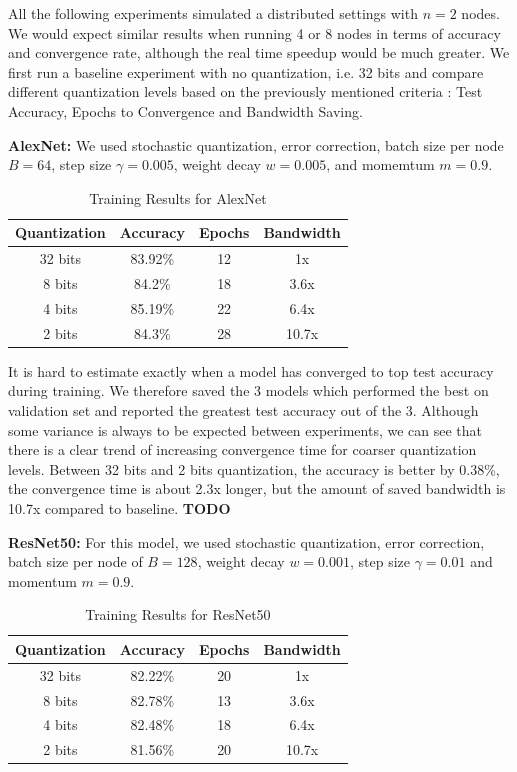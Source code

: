 \documentclass[10pt,conference,compsocconf]{IEEEtran}
\begin{document}
All the following experiments simulated a distributed settings with $n = 2$ nodes. We would expect similar results when running 4 or 8 nodes in terms of accuracy and convergence rate, although the real time speedup would be much greater. We first run a baseline experiment with no quantization, i.e. 32 bits and compare different quantization levels based on the previously mentioned criteria : Test Accuracy, Epochs to Convergence and Bandwidth Saving.

\textbf{AlexNet:} We used stochastic quantization, error correction, batch size per node $B = 64$, step size $\gamma = 0.005$, weight decay $w = 0.005$, and momemtum $m = 0.9$. 

\begin{table}[htbp]
  \centering
  \begin{tabular}[c]{|c||c|c|c|}
    \hline
	  Quantization&Accuracy&Epochs&Bandwidth\\
    \hline
	  32 bits&83.92\% &12&1x\\
	  8 bits&84.2\%&18&3.6x\\
	  4 bits&85.19\%&22&6.4x\\
	  2 bits&84.3\%&28&10.7x\\
    \hline
  \end{tabular}
	\vspace{0.7em}
	\caption{Training Results for AlexNet}
\end{table}

\vspace{-1.5em}
\noindent It is hard to estimate exactly when a model has converged to top test accuracy during training. We therefore saved the 3 models which performed the best on validation set and reported the greatest test accuracy out of the 3. Although some variance is always to be expected between experiments, we can see that there is a clear trend of increasing convergence time for coarser quantization levels. Between 32 bits and 2 bits quantization, the accuracy is better by 0.38\%, the convergence time is about 2.3x longer, but the amount of saved bandwidth is 10.7x compared to baseline. \textbf{TODO}
\vspace{0.3em}


\textbf{ResNet50:} For this model, we used stochastic quantization, error correction, batch size per node of $B = 128$, weight decay $w = 0.001$, step size $\gamma = 0.01$ and momentum $m = 0.9$.
\begin{table}[htbp]
  \centering
  \begin{tabular}[c]{|c||c|c|c|}
    \hline
          Quantization&Accuracy&Epochs&Bandwidth\\
    \hline
          32 bits&82.22\% &20&1x\\
          8 bits&82.78\%&13&3.6x\\
          4 bits&82.48\%&18&6.4x\\
          2 bits&81.56\%&20&10.7x\\
    \hline
  \end{tabular}
        \vspace{0.7em}
        \caption{Training Results for ResNet50}
\end{table}
\end{document}
